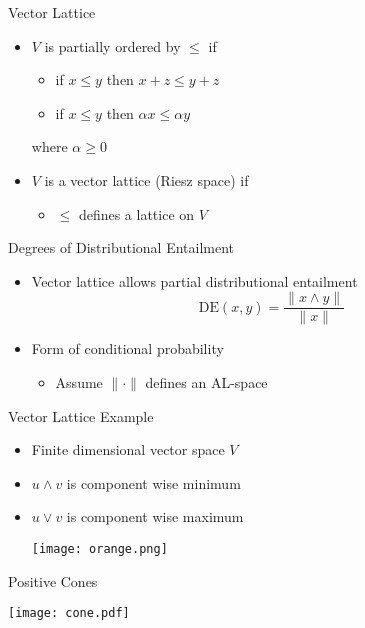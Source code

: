 \documentclass{beamer}
\newlength{\wideitemsep}
\let\olditem\item
\renewcommand{\item}{\setlength{\itemsep}{\wideitemsep}\olditem}
\begin{document}
\begin{frame}{Vector Lattice}
\begin{itemize}
\item $V$ is partially ordered by $\le$ if
\begin{itemize}
\item if $x \le y$ then $x + z \le y + z$\\
\item if $x \le y$ then $\alpha x \le \alpha y$
\end{itemize}
where $\alpha \ge 0$
\item $V$ is a vector lattice (Riesz space) if
\begin{itemize}
\item $\le$ defines a lattice on $V$
\end{itemize}
\end{itemize}
\end{frame}

\begin{frame}{Degrees of Distributional Entailment}
\begin{itemize}
\item Vector lattice allows partial distributional entailment
$$\mathrm{DE}(x,y) = \frac{\|x \land y\|}{\|x\|}$$
\item Form of conditional probability
\begin{itemize}
\item Assume $\|\cdot\|$ defines an AL-space
\end{itemize}
\end{itemize}
\end{frame}

\begin{frame}{Vector Lattice Example}
\begin{itemize}
\item Finite dimensional vector space $V$
\item $u\land v$ is component wise minimum
\item $u\lor v$ is component wise maximum
\begin{center}
\texttt{[image: orange.png]}
\end{center}
\end{itemize}
\end{frame}

\begin{frame}{Positive Cones}
\begin{center}
\texttt{[image: cone.pdf]}
\end{center}
\end{frame}
\end{document}
